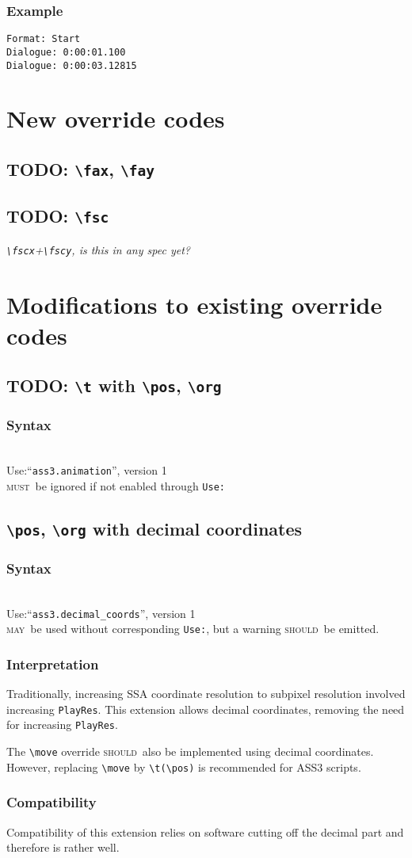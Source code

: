 \documentclass[11pt,a4paper]{article}
\newcommand{\todo}{\textbf\textsf{\color{hl}TODO: }}
\newcommand{\ann}[1]{\textit\textsf{\color{ann}#1}}
\newcommand{\may}{\textsc{may}}
\newcommand{\should}{\textsc{should}}
\newcommand{\must}{\textsc{must}}
\newcommand{\oc}[1]{\texttt{\textbackslash #1}}
\newcommand{\syntax}[1]{
	\subsubsection*{Syntax}
	\begin{tabbing}
	\hspace{2cm}\=\\[-16pt]
	#1
	\end{tabbing}
}
\newcommand{\mustuse}{\must\ be ignored if not enabled through \texttt{Use:}}
\newcommand{\mayuse}{\may\ be used without corresponding \texttt{Use:},
	but a warning \should\ be emitted.}
\newcommand{\usespec}[3]{Use:\>``\texttt{#1}'', version #2\\\> #3}
\begin{document}
\subsubsection*{Example}
\begin{verbatim}
Format: Start
Dialogue: 0:00:01.100
Dialogue: 0:00:03.12815
\end{verbatim}

\section{New override codes}
\subsection{\todo \oc{fax}, \oc{fay}}

\subsection{\todo \oc{fsc}}
\ann{\oc{fscx}+\oc{fscy}, is this in any spec yet?}

\section{Modifications to existing override codes}
\subsection{\todo \oc{t} with \oc{pos}, \oc{org}}
\syntax{\usespec{ass3.animation}{1}{\mustuse}}

\subsection{\oc{pos}, \oc{org} with decimal coordinates}
\syntax{\usespec{ass3.decimal\_coords}{1}{\mayuse}}

\subsubsection*{Interpretation}
Traditionally, increasing SSA coordinate resolution to subpixel
resolution involved increasing \texttt{PlayRes}. This extension
allows decimal coordinates, removing the need for increasing
\texttt{PlayRes}.

The \oc{move} override \should\ also be implemented using
decimal coordinates. However, replacing \oc{move} by
\oc{t(\oc{pos})} is recommended for ASS3 scripts.

\subsubsection*{Compatibility}
Compatibility of this extension relies on software cutting off
the decimal part and therefore is rather well.
 
\end{document}
